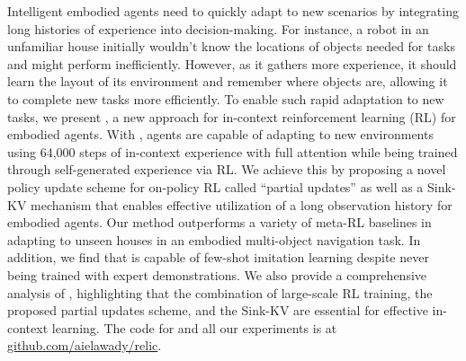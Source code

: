  Intelligent embodied agents need to quickly adapt to new scenarios by integrating long histories of experience into decision-making. For instance, a robot in an unfamiliar house initially wouldn't know the locations of objects needed for tasks and might perform inefficiently. However, as it gathers more experience, it should learn the layout of its environment and remember where objects are, allowing it to complete new tasks more efficiently. To enable such rapid adaptation to new tasks, we present \method, a new approach for in-context reinforcement learning (RL) for embodied agents. With \method, agents are capable of adapting to new environments using 64,000 steps of in-context experience with full attention while being trained through self-generated experience via RL. We achieve this by proposing a novel policy update scheme for on-policy RL called ``partial updates'' as well as a Sink-KV mechanism that enables effective utilization of a long observation history for embodied agents. Our method outperforms a variety of meta-RL baselines in adapting to unseen houses in an embodied multi-object navigation task. In addition, we find that \method is capable of few-shot imitation learning despite never being trained with expert demonstrations. We also provide a comprehensive analysis of \method, highlighting that the combination of large-scale RL training, the proposed partial updates scheme, and the Sink-KV are essential for effective in-context learning.
The code for \method and all our experiments is at \href{https://github.com/aielawady/relic}{github.com/aielawady/relic}.
